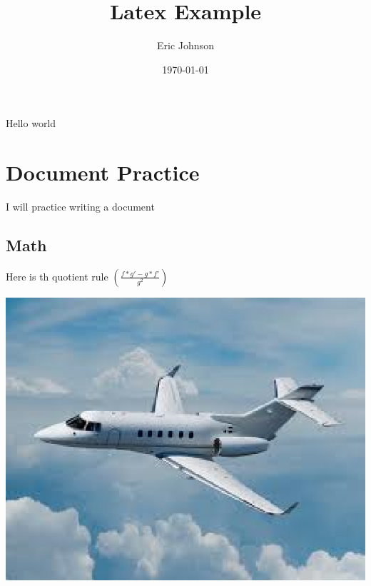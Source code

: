 \documentclass{article}
\title{Latex Example}
\author{Eric Johnson}
\date{\today}
\begin{document}
\maketitle 
Hello world


\section{Document Practice}
I will practice writing a document
\subsection{Math}
Here is th quotient rule 
\begin{math}
\left(\frac{f*g' - g*f'}{g^2}\right)
\end{math}

\includegraphics[scale=1]{plane.eps}
\end{document}

